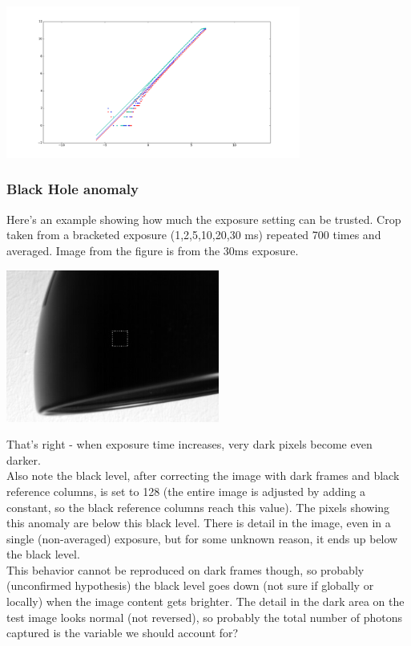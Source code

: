 {\begin{center}
\includegraphics[height=5cm]{images/curve-old}
\end{center}


\subsubsection{Black Hole anomaly}

Here's an example showing how much the exposure setting can be trusted. Crop taken from a bracketed exposure (1,2,5,10,20,30 ms) repeated 700 times and averaged. Image from the figure is from the 30ms exposure.\\ 

\begin{center}
\includegraphics[height=5cm]{images/blackhole}
\end{center}

That's right - when exposure time increases, very dark pixels become even darker.\\

Also note the black level, after correcting the image with dark frames and black reference columns, is set to 128 (the entire image is adjusted by adding a constant, so the black reference columns reach this value). The pixels showing this anomaly are below this black level. There is detail in the image, even in a single (non-averaged) exposure, but for some unknown reason, it ends up below the black level.\\

This behavior cannot be reproduced on dark frames though, so probably (unconfirmed hypothesis) the black level goes down (not sure if globally or locally) when the image content gets brighter. The detail in the dark area on the test image looks normal (not reversed), so probably the total number of photons captured is the variable we should account for? \\


}
